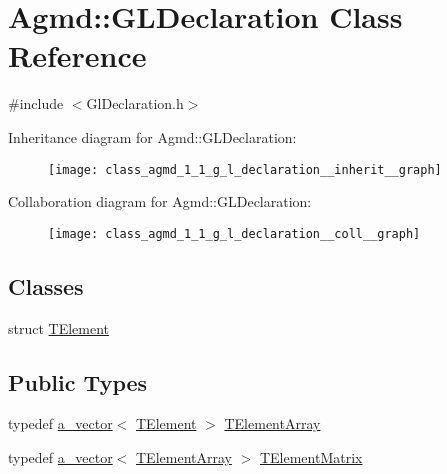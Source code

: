 \hypertarget{class_agmd_1_1_g_l_declaration}{\section{Agmd\+:\+:G\+L\+Declaration Class Reference}
\label{class_agmd_1_1_g_l_declaration}
}


{\ttfamily \#include $<$Gl\+Declaration.\+h$>$}



Inheritance diagram for Agmd\+:\+:G\+L\+Declaration\+:\nopagebreak
\begin{figure}[H]
\begin{center}
\leavevmode
\texttt{[image: class\_agmd\_1\_1\_g\_l\_declaration\_\_inherit\_\_graph]}
\end{center}
\end{figure}


Collaboration diagram for Agmd\+:\+:G\+L\+Declaration\+:\nopagebreak
\begin{figure}[H]
\begin{center}
\leavevmode
\texttt{[image: class\_agmd\_1\_1\_g\_l\_declaration\_\_coll\_\_graph]}
\end{center}
\end{figure}
\subsection*{Classes}
\begin{DoxyCompactItemize}
\item 
struct \hyperlink{struct_agmd_1_1_g_l_declaration_1_1_t_element}{T\+Element}
\end{DoxyCompactItemize}
\subsection*{Public Types}
\begin{DoxyCompactItemize}
\item 
typedef \hyperlink{_vector_8h_a3df82cea60ff4ad0acb44e58454406a5}{a\+\_\+vector}$<$ \hyperlink{struct_agmd_1_1_g_l_declaration_1_1_t_element}{T\+Element} $>$ \hyperlink{class_agmd_1_1_g_l_declaration_ac27d21b565226320017925e6d79cf5ec}{T\+Element\+Array}
\item 
typedef \hyperlink{_vector_8h_a3df82cea60ff4ad0acb44e58454406a5}{a\+\_\+vector}$<$ \hyperlink{class_agmd_1_1_g_l_declaration_ac27d21b565226320017925e6d79cf5ec}{T\+Element\+Array} $>$ \hyperlink{class_agmd_1_1_g_l_declaration_a8efdeef74a5b78ebe90c301ba7a3331f}{T\+Element\+Matrix}
\end{DoxyCompactItemize}
